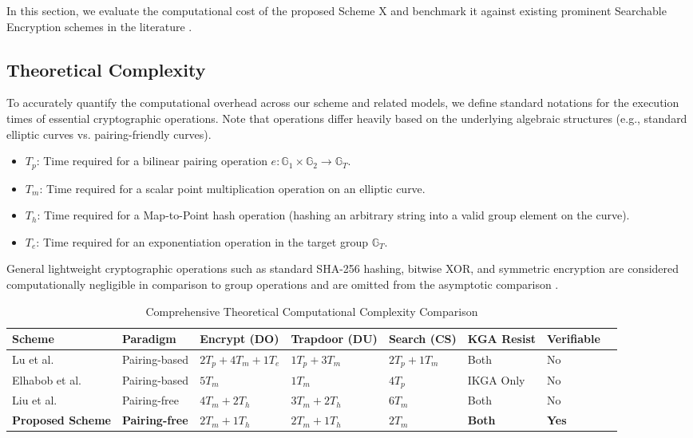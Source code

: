 \documentclass[10pt,journal,compsoc]{IEEEtran}
\begin{document}
In this section, we evaluate the computational cost of the proposed Scheme X and benchmark it against existing prominent Searchable Encryption schemes in the literature \cite{lu2023certificateless, elhabob2020efficient, liu2023pairing}. 

\subsection{Theoretical Complexity}
To accurately quantify the computational overhead across our scheme and related models, we define standard notations for the execution times of essential cryptographic operations. Note that operations differ heavily based on the underlying algebraic structures (e.g., standard elliptic curves vs. pairing-friendly curves).
\begin{itemize}
    \item $T_p$: Time required for a bilinear pairing operation $e: \mathbb{G}_1 \times \mathbb{G}_2 \rightarrow \mathbb{G}_T$.
    \item $T_m$: Time required for a scalar point multiplication operation on an elliptic curve.
    \item $T_h$: Time required for a Map-to-Point hash operation (hashing an arbitrary string into a valid group element on the curve).
    \item $T_e$: Time required for an exponentiation operation in the target group $\mathbb{G}_T$.
\end{itemize}
General lightweight cryptographic operations such as standard SHA-256 hashing, bitwise XOR, and symmetric encryption are considered computationally negligible in comparison to group operations and are omitted from the asymptotic comparison \cite{liu2023pairing}.

\begin{table}[htbp]
\centering
\caption{Comprehensive Theoretical Computational Complexity Comparison}\label{tab1}
\begin{tabular}{@{}llllllll@{}}
\toprule
\textbf{Scheme} & \textbf{Paradigm} & \textbf{Encrypt (DO)} & \textbf{Trapdoor (DU)} & \textbf{Search (CS)} & \textbf{KGA Resist} & \textbf{Verifiable}\\
\midrule
Lu et al. \cite{lu2023certificateless} & Pairing-based & $2 T_p + 4 T_m + 1 T_e$ & $1 T_p + 3 T_m$ & $2 T_p + 1 T_m$ & Both & No \\
Elhabob et al. \cite{elhabob2020efficient} & Pairing-based & $5 T_m$ & $1 T_m$ & $4 T_p$ & IKGA Only & No \\
Liu et al. \cite{liu2023pairing} & Pairing-free & $4 T_m + 2 T_h$ & $3 T_m + 2 T_h$ & $6 T_m$ & Both & No \\
\textbf{Proposed Scheme} & \textbf{Pairing-free} & \textbf{$2 T_m + 1 T_h$} & \textbf{$2 T_m + 1 T_h$} & \textbf{$2 T_m$} & \textbf{Both} & \textbf{Yes} \\
\bottomrule
\end{tabular}
\end{table}
\end{document}
